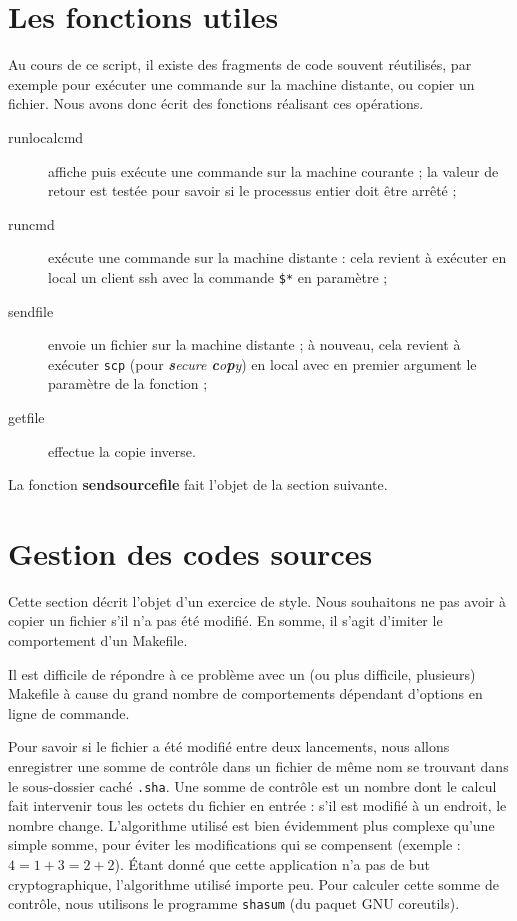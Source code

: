 \section{Les fonctions utiles}

Au cours de ce script, il existe des fragments de code souvent
réutilisés, par exemple pour exécuter une commande sur la machine
distante, ou copier un fichier. Nous avons donc écrit des fonctions
réalisant ces opérations.

\begin{description}
\item[runlocalcmd] affiche puis exécute une commande sur la machine
  courante ; la valeur de retour est testée pour savoir si le
  processus entier doit être arrêté ;
\item[runcmd] exécute une commande sur la machine distante : cela
  revient à exécuter en local un client ssh avec la commande
  \texttt{\$*} en paramètre ;
\item[sendfile] envoie un fichier sur la machine distante ; à nouveau,
  cela revient à exécuter \texttt{scp} (pour \emph{\textbf{s}ecure
    \textbf{c}o\textbf{p}y}) en local avec en premier argument le
  paramètre de la fonction ;
\item[getfile] effectue la copie inverse.
\end{description}

La fonction \textbf{sendsourcefile} fait l'objet de la section
suivante.


\section{Gestion des codes sources}

Cette section décrit l'objet d'un exercice de style. Nous souhaitons
ne pas avoir à copier un fichier s'il n'a pas été modifié. En somme,
il s'agit d'imiter le comportement d'un Makefile.

Il est difficile de répondre à ce problème avec un (ou plus difficile,
plusieurs) Makefile à cause du grand nombre de comportements dépendant
d'options en ligne de commande.

Pour savoir si le fichier a été modifié entre deux lancements, nous
allons enregistrer une somme de contrôle dans un fichier de même nom
se trouvant dans le sous-dossier caché \texttt{.sha}. Une somme de
contrôle est un nombre dont le calcul fait intervenir tous les octets
du fichier en entrée : s'il est modifié à un endroit, le nombre
change. L'algorithme utilisé est bien évidemment plus complexe qu'une
simple somme, pour éviter les modifications qui se compensent (exemple
: $4 = 1 + 3 = 2 + 2$). Étant donné que cette application n'a pas de
but cryptographique, l'algorithme utilisé importe peu. Pour calculer
cette somme de contrôle, nous utilisons le programme \texttt{shasum}
(du paquet GNU coreutils).

